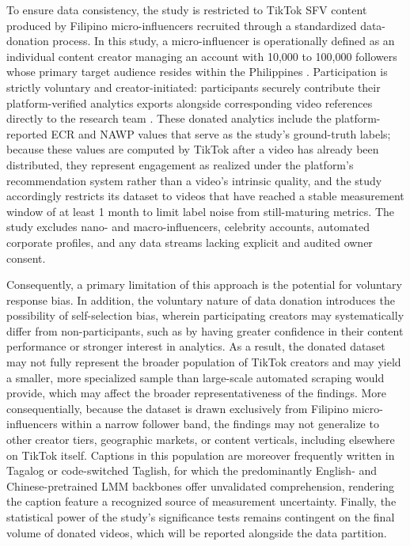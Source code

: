 To ensure data consistency, the study is restricted to TikTok SFV content produced by Filipino micro-influencers recruited through a standardized data-donation process. In this study, a micro-influencer is operationally defined as an individual content creator managing an account with 10,000 to 100,000 followers whose primary target audience resides within the Philippines \cite{anymindgroup_2026_state}. Participation is strictly voluntary and creator-initiated: participants securely contribute their platform-verified analytics exports alongside corresponding video references directly to the research team \cite{zannettou2024analyzing, garimella_2025_data, li2024delving}. These donated analytics include the platform-reported ECR and NAWP values that serve as the study's ground-truth labels; because these values are computed by TikTok after a video has already been distributed, they represent engagement as realized under the platform's recommendation system rather than a video's intrinsic quality, and the study accordingly restricts its dataset to videos that have reached a stable measurement window of at least 1 month to limit label noise from still-maturing metrics. The study excludes nano- and macro-influencers, celebrity accounts, automated corporate profiles, and any data streams lacking explicit and audited owner consent. 

Consequently, a primary limitation of this approach is the potential for voluntary response bias. In addition, the voluntary nature of data donation introduces the possibility of self-selection bias, wherein participating creators may systematically differ from non-participants, such as by having greater confidence in their content performance or stronger interest in analytics. As a result, the donated dataset may not fully represent the broader population of TikTok creators and may yield a smaller, more specialized sample than large-scale automated scraping would provide, which may affect the broader representativeness of the findings. More consequentially, because the dataset is drawn exclusively from Filipino micro-influencers within a narrow follower band, the findings may not generalize to other creator tiers, geographic markets, or content verticals, including elsewhere on TikTok itself. Captions in this population are moreover frequently written in Tagalog or code-switched Taglish, for which the predominantly English- and Chinese-pretrained LMM backbones offer unvalidated comprehension, rendering the caption feature a recognized source of measurement uncertainty. Finally, the statistical power of the study's significance tests remains contingent on the final volume of donated videos, which will be reported alongside the data partition.

